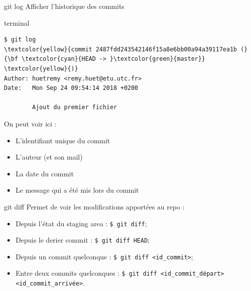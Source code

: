 \documentclass[usepdftitle=false]{beamer}
\def\seplength{.3\topsep}
\newcommand{\Pause}{%
\ifdef{\Release}
  {\pause}
  {}
}
\begin{document}
\begin{frame}[fragile]{git log}
	Afficher l'historique des commits
	\begin{beamercolorbox}[rounded=true,shadow=true]{terminal}
		\vspace{-\seplength}
		\begin{Verbatim}
$ git log
\textcolor{yellow}{commit 2487fdd243542146f15a8e6bb00a94a39117ea1b (}{\bf \textcolor{cyan}{HEAD -> }\textcolor{green}{master}} \textcolor{yellow}{)}
Author: huetremy <remy.huet@etu.utc.fr>
Date:   Mon Sep 24 09:54:14 2018 +0200

    	Ajout du premier fichier
		\end{Verbatim}
	\end{beamercolorbox}
	\Pause
	On peut voir ici : \Pause
	\begin{itemize}
		\item L'identifiant unique du commit \Pause
		\item L'auteur (et son mail) \Pause
		\item La date du commit \Pause
		\item Le message qui a été mis lors du commit
	\end{itemize}
\end{frame}

\begin{frame}[fragile]{git diff}
	Permet de voir les modifications apportées au repo :
	\begin{itemize}
		\item Depuis l'état du staging area : \verb+$ git diff+;
		\item Depuis le derier commit : \verb+$ git diff HEAD+;
		\item Depuis un commit quelconque : \verb+$ git diff <id_commit>+;
		\item Entre deux commits quelconques : \verb+$ git diff <id_commit_départ> <id_commit_arrivée>+.
	\end{itemize}
\end{frame}
\end{document}
